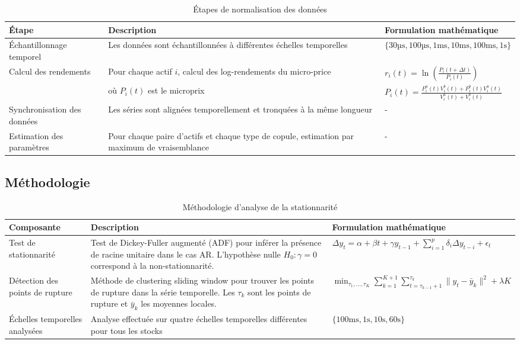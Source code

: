 \documentclass[10pt,a4paper]{article}
\theoremstyle{definition}
\theoremstyle{remark}
\begin{document}
\begin{landscape}
\begin{table}[h!]
\centering
\begin{tabular}{|p{4cm}|p{6cm}|p{6cm}|}
\hline
\textbf{Étape} & \textbf{Description} & \textbf{Formulation mathématique} \\
\hline
Échantillonnage temporel & Les données sont échantillonnées à différentes échelles temporelles & $\{\text{30µs}, \text{100µs}, \text{1ms}, \text{10ms}, \text{100ms}, \text{1s}\}$ \\
\hline
Calcul des rendements & Pour chaque actif $i$, calcul des log-rendements du micro-price & $r_i(t) = \ln\left(\frac{P_i(t+\Delta t)}{P_i(t)}\right)$ \\
& où $P_i(t)$ est le microprix & $P_i(t) = \frac{P^a_i(t)V^b_i(t) + P^b_i(t)V^a_i(t)}{V^a_i(t) + V^b_i(t)}$ \\
\hline
Synchronisation des données & Les séries sont alignées temporellement et tronquées à la même longueur & - \\
\hline
Estimation des paramètres & Pour chaque paire d'actifs et chaque type de copule, estimation par maximum de vraisemblance & - \\
\hline
\end{tabular}
\caption{Étapes de normalisation des données}
\label{tab:norm_steps}
\end{table}
\end{landscape}


\subsection{Méthodologie}

\begin{landscape}
\begin{table}[h!]
\centering
\begin{tabular}{|p{4cm}|p{8cm}|p{8cm}|}
\hline
\textbf{Composante} & \textbf{Description} & \textbf{Formulation mathématique} \\
\hline
Test de stationnarité & Test de Dickey-Fuller augmenté (ADF) pour inférer la présence de racine unitaire dans le cas AR. L'hypothèse nulle $H_0: \gamma = 0$ correspond à la non-stationnarité. & $\Delta y_t = \alpha + \beta t + \gamma y_{t-1} + \sum_{i=1}^p \delta_i \Delta y_{t-i} + \epsilon_t$ \\
\hline
Détection des points de rupture & Méthode de clustering sliding window pour trouver les points de rupture dans la série temporelle. Les $\tau_k$ sont les points de rupture et $\bar{y}_k$ les moyennes locales. & $\min_{\tau_1,\ldots,\tau_K} \sum_{k=1}^{K+1} \sum_{t=\tau_{k-1}+1}^{\tau_k} \|y_t - \bar{y}_k\|^2 + \lambda K$ \\
\hline
Échelles temporelles analysées & Analyse effectuée sur quatre échelles temporelles différentes pour tous les stocks & $\{\text{100ms}, \text{1s}, \text{10s}, \text{60s}\}$ \\
\hline
\end{tabular}
\caption{Méthodologie d'analyse de la stationnarité}
\label{tab:stationarity_methodology}
\end{table}
\end{landscape}
\end{document}
